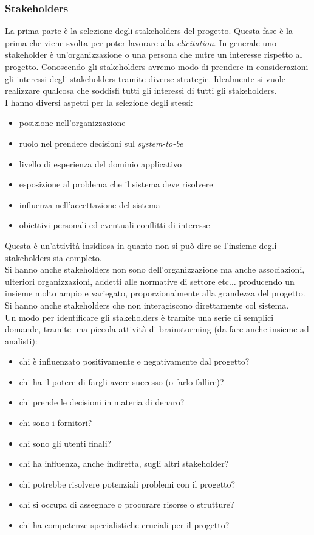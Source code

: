 \documentclass[a4paper,12pt, oneside]{book}
\begin{document}
\subsubsection{Stakeholders}
La prima parte è la selezione degli stakeholders del progetto. Questa fase è la
prima che viene svolta per poter lavorare alla \textit{elicitation}. In generale
uno stakeholder è un'organizzazione o una persona che nutre un interesse
rispetto al progetto. Conoscendo gli stakeholders avremo modo di prendere in
considerazioni gli interessi degli stakeholders tramite diverse
strategie. Idealmente si vuole realizzare qualcosa che soddisfi tutti gli
interessi di tutti gli stakeholders.\\
I hanno diversi aspetti per la selezione degli stessi:
\begin{itemize}
  \item posizione nell'organizzazione
  \item ruolo nel prendere decisioni sul \textit{system-to-be}
  \item livello di esperienza del dominio applicativo
  \item esposizione al problema che il sistema deve risolvere
  \item influenza nell'accettazione del sistema
  \item obiettivi personali ed eventuali conflitti di interesse
\end{itemize}
Questa è un'attività insidiosa in quanto non si può dire se l'insieme degli
stakeholders sia completo.\\
Si hanno anche stakeholders non sono dell'organizzazione ma anche associazioni,
ulteriori organizzazioni,
addetti alle normative di settore etc$\ldots$ producendo un insieme molto ampio
e variegato, proporzionalmente alla grandezza del progetto. Si hanno anche
stakeholders che non interagiscono direttamente col sistema.\\
Un modo per identificare gli stakeholders è tramite una serie di semplici
domande, tramite una piccola attività di brainstorming (da fare anche insieme ad
analisti):
\begin{itemize}
  \item chi è influenzato positivamente e negativamente dal progetto? 
  \item chi ha il potere di fargli avere successo (o farlo fallire)? 
  \item chi prende le decisioni in materia di denaro? 
  \item chi sono i fornitori? 
  \item chi sono gli utenti finali? 
  \item chi ha influenza, anche indiretta, sugli altri stakeholder? 
  \item chi potrebbe risolvere potenziali problemi con il progetto? 
  \item chi si occupa di assegnare o procurare risorse o strutture? 
  \item chi ha competenze specialistiche cruciali per il progetto?
\end{itemize}
\end{document}
